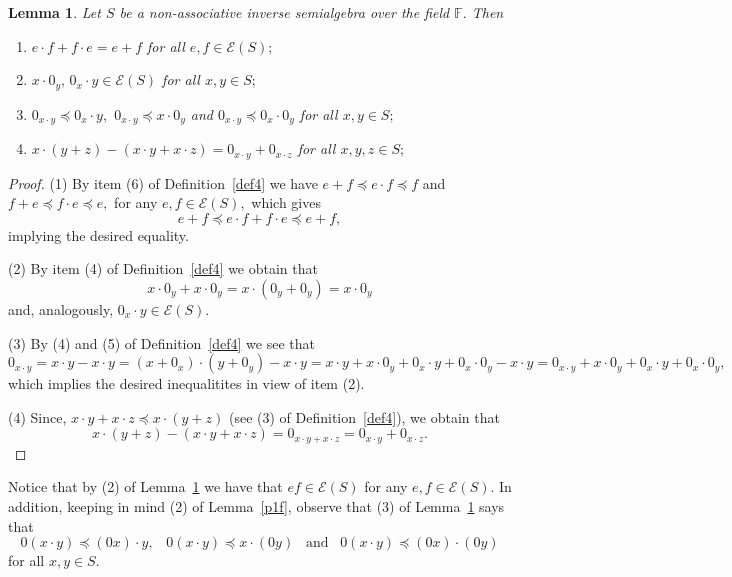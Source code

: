 \documentclass{amsart}
\newcommand{\E}{\mathcal{E}}
\newcommand{\0}{{\vartheta}}
\newtheorem{lem}[thm]{Lemma}
\theoremstyle{definition}
\theoremstyle{remark}
\numberwithin{equation}{section}
\newtheorem*{Theorem A}{\textbf{Theorem A}}
\newtheorem*{Corollary E}{\textbf{Corollary E}}
\newtheorem*{Corollary F}{\textbf{Corollary F}}
\newtheorem*{Theorem B}{\textbf{Theorem B}}
\newtheorem*{Theorem C}{\textbf{Theorem C}}
\newtheorem*{Theorem D}{\textbf{Theorem B}}
\newtheorem*{p a}{\textbf{Proof of  Theorem A}}
\newtheorem*{p b}{\textbf{Proof of Theorem B}}
\newtheorem*{p c}{\textbf{Proof of  Theorem C}}
\newtheorem*{p d}{\textbf{Proof of  Theorem D}}
\begin{document}
\begin{lem}\label{lemma_basicproperties}
Let $S$ be a  non-associative inverse semialgebra   over the field $\mathbb{F}.$ Then


\begin{enumerate}
\item $e \cdot f + f\cdot e = e+f$ for all $e,f \in \E (S);$
\item $x\cdot 0_y, \, 0_x \cdot y \in \E(S)$ for all $x,y\in S;$
     \item 	$0_{x\cdot y}\preceq 0_x\cdot y,$ 
     $0_{x\cdot y}\preceq x \cdot 0_y$ and $0_{x\cdot y}\preceq 0_x \cdot 0_y$ for all $x,y\in S;$ 
    \item $x \cdot (y+z)-(x\cdot y+x\cdot z) = 0_{x\cdot y}+0_{x\cdot z}$ for all $x,y,z\in S;$
\end{enumerate} 
\end{lem}
\begin{proof}
(1)  By item (6) of Definition~\ref{def4}  we have  $e+f \preceq  e\cdot f \preceq  f $ and  $f+e \preceq  f\cdot e \preceq  e ,$ for any $e,f \in \E (S),$ which gives  $$e+f \preceq  e\cdot f + f \cdot e \preceq  e+ f,  $$ implying the desired equality.

(2)  By item (4) of Definition~\ref{def4}   we obtain that
$$ x\cdot 0_y + x\cdot 0_y = x\cdot (0_y +  0_y)
=  x\cdot 0_y $$ and, analogously, $ 0_x \cdot y \in \E(S).$ 

(3) By (4) and  (5)  of Definition~\ref{def4} we see that 
$$0_{x\cdot y}=x\cdot y-x\cdot y=(x+0_x)\cdot (y+0_y)-x\cdot y=x\cdot y + x\cdot 0_y + 0_{x}\cdot y+0_{x}\cdot 0_y -x\cdot y = 0_{x\cdot y} + x\cdot 0_y + 0_{x}\cdot y+0_{x}\cdot 0_y,$$ which implies the desired inequalitites in view of item (2).
 
(4) Since,  $x\cdot y+x\cdot z\preceq x\cdot (y+z)$ (see (3) of Definition~\ref{def4}),  we obtain that
$$x\cdot (y+z)-(x\cdot y+x\cdot z)=0_{x\cdot y+x\cdot z}=0_{x\cdot y}+0_{x\cdot z}.$$
\end{proof}

Notice that by (2) of 
 Lemma~\ref{lemma_basicproperties}  we have that $ef \in \E(S)$  for any $e,f \in \E (S).$ In addition, keeping in mind (2) of Lemma~\ref{p1f}, observe that  
 (3) of  Lemma~\ref{lemma_basicproperties} says  that 
     $$0 (x\cdot y) \preceq (0x)\cdot y, \;\;\; 0(x\cdot y)\preceq x \cdot (0y)  \;\;\; \text{and} \;\;\; 
     0(x\cdot y)\preceq (0x) \cdot (0y)$$ for all $x,y\in S.$ 
		
\end{document}
